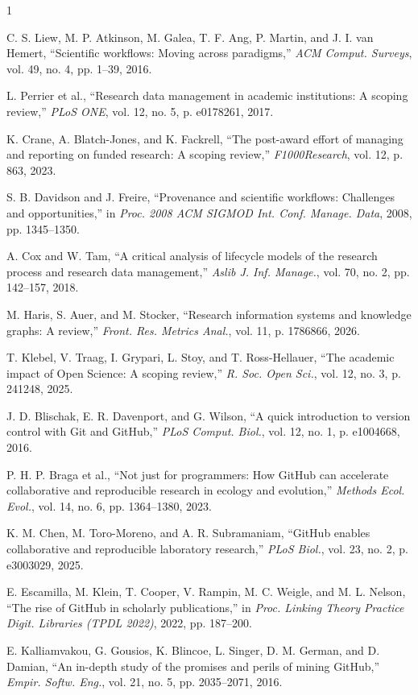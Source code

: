 \documentclass{IEEEcsmag}
\begin{document}
\begin{thebibliography}{1}

C. S. Liew, M. P. Atkinson, M. Galea, T. F. Ang, P. Martin, and J. I. van Hemert, ``Scientific workflows: Moving across paradigms,'' {\it ACM Comput. Surveys}, vol. 49, no. 4, pp. 1--39, 2016.

L. Perrier et al., ``Research data management in academic institutions: A scoping review,'' {\it PLoS ONE}, vol. 12, no. 5, p. e0178261, 2017.

K. Crane, A. Blatch-Jones, and K. Fackrell, ``The post-award effort of managing and reporting on funded research: A scoping review,'' {\it F1000Research}, vol. 12, p. 863, 2023.

S. B. Davidson and J. Freire, ``Provenance and scientific workflows: Challenges and opportunities,'' in {\it Proc. 2008 ACM SIGMOD Int. Conf. Manage. Data}, 2008, pp. 1345--1350.

A. Cox and W. Tam, ``A critical analysis of lifecycle models of the research process and research data management,'' {\it Aslib J. Inf. Manage.}, vol. 70, no. 2, pp. 142--157, 2018.

M. Haris, S. Auer, and M. Stocker, ``Research information systems and knowledge graphs: A review,'' {\it Front. Res. Metrics Anal.}, vol. 11, p. 1786866, 2026.

T. Klebel, V. Traag, I. Grypari, L. Stoy, and T. Ross-Hellauer, ``The academic impact of Open Science: A scoping review,'' {\it R. Soc. Open Sci.}, vol. 12, no. 3, p. 241248, 2025.

J. D. Blischak, E. R. Davenport, and G. Wilson, ``A quick introduction to version control with Git and GitHub,'' {\it PLoS Comput. Biol.}, vol. 12, no. 1, p. e1004668, 2016.

P. H. P. Braga et al., ``Not just for programmers: How GitHub can accelerate collaborative and reproducible research in ecology and evolution,'' {\it Methods Ecol. Evol.}, vol. 14, no. 6, pp. 1364--1380, 2023.

K. M. Chen, M. Toro-Moreno, and A. R. Subramaniam, ``GitHub enables collaborative and reproducible laboratory research,'' {\it PLoS Biol.}, vol. 23, no. 2, p. e3003029, 2025.

E. Escamilla, M. Klein, T. Cooper, V. Rampin, M. C. Weigle, and M. L. Nelson, ``The rise of GitHub in scholarly publications,'' in {\it Proc. Linking Theory Practice Digit. Libraries (TPDL 2022)}, 2022, pp. 187--200.

E. Kalliamvakou, G. Gousios, K. Blincoe, L. Singer, D. M. German, and D. Damian, ``An in-depth study of the promises and perils of mining GitHub,'' {\it Empir. Softw. Eng.}, vol. 21, no. 5, pp. 2035--2071, 2016.

\end{thebibliography}
\end{document}
